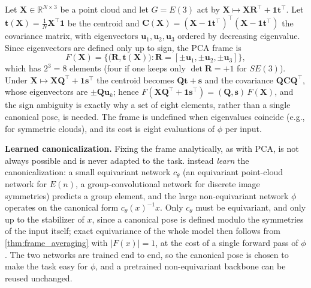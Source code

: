\begin{example}\label{ex:frame_pca}
Let $\mathbf{X} \in \mathbb{R}^{N \times 3}$ be a point cloud and let $G = E(3)$ act by $\mathbf{X} \mapsto \mathbf{X}\mathbf{R}^{\top} + \mathbf{1}\mathbf{t}^{\top}$. Let $\mathbf{t}(\mathbf{X}) = \frac{1}{N}\mathbf{X}^{\top}\mathbf{1}$ be the centroid and $\mathbf{C}(\mathbf{X}) = (\mathbf{X} - \mathbf{1}\mathbf{t}^{\top})^{\top}(\mathbf{X} - \mathbf{1}\mathbf{t}^{\top})$ the covariance matrix, with eigenvectors $\mathbf{u}_1, \mathbf{u}_2, \mathbf{u}_3$ ordered by decreasing eigenvalue. Since eigenvectors are defined only up to sign, the \gls{PCA} frame is
\[F(\mathbf{X}) = \Big\{ \big(\mathbf{R}, \mathbf{t}(\mathbf{X})\big) : \mathbf{R} = [\pm\mathbf{u}_1, \pm\mathbf{u}_2, \pm\mathbf{u}_3] \Big\},\]
which has $2^3 = 8$ elements (four if one keeps only $\det \mathbf{R} = +1$ for $SE(3)$). Under $\mathbf{X} \mapsto \mathbf{X}\mathbf{Q}^{\top} + \mathbf{1}\mathbf{s}^{\top}$ the centroid becomes $\mathbf{Q}\mathbf{t} + \mathbf{s}$ and the covariance $\mathbf{Q}\mathbf{C}\mathbf{Q}^{\top}$, whose eigenvectors are $\pm\mathbf{Q}\mathbf{u}_k$; hence $F(\mathbf{X}\mathbf{Q}^{\top} + \mathbf{1}\mathbf{s}^{\top}) = (\mathbf{Q}, \mathbf{s})\,F(\mathbf{X})$, and the sign ambiguity is exactly why a set of eight elements, rather than a single canonical pose, is needed. The frame is undefined when eigenvalues coincide (e.g., for symmetric clouds), and its cost is eight evaluations of $\phi$ per input.
\end{example}

\textbf{Learned canonicalization.} Fixing the frame analytically, as with \gls{PCA}, is not always possible and is never adapted to the task. \citet{kaba2023canonicalization} instead \emph{learn} the canonicalization: a small equivariant network $c_\theta$ (an equivariant point-cloud network for $E(n)$, a group-convolutional network for discrete image symmetries) predicts a group element, and the large non-equivariant network $\phi$ operates on the canonical form $c_\theta(x)^{-1}x$. Only $c_\theta$ must be equivariant, and only up to the stabilizer of $x$, since a canonical pose is defined modulo the symmetries of the input itself; exact equivariance of the whole model then follows from \autoref{thm:frame_averaging} with $|F(x)| = 1$, at the cost of a single forward pass of $\phi$. The two networks are trained end to end, so the canonical pose is chosen to make the task easy for $\phi$, and a pretrained non-equivariant backbone can be reused unchanged.

